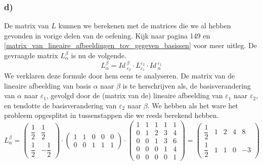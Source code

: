 \documentclass[lineaire_algebra_oplossingen.tex]{subfiles}
\begin{document}
\subsubsection*{d)}
De matrix van $L$ kunnen we berekenen met de matrices die we al hebben gevonden in vorige delen van de oefening. Kijk naar pagina 149 en \ref{matrix_van_lineaire_afbeeldingen_tov_gegeven_basissen} voor meer uitleg.
De gevraagde matrix $L_\alpha^\beta$ is nu de volgende.
\[
L_\alpha^\beta = \textit{Id}\,_{\varepsilon_2}^\beta\cdot L_{\varepsilon_1}^{\varepsilon_2}\cdot \textit{Id}\,_{\alpha}^{\varepsilon_1}
\]
We verklaren deze formule door hem eens te analyseren. De matrix van de lineaire afbeelding van basis $\alpha$ naar $\beta$ is te herschrijven als, de basisverandering van $\alpha$ naar $\varepsilon_1$, gevolgd door de (matrix van de) lineaire afbeelding van $\varepsilon_1$ naar $\varepsilon_2$, en tenslotte de basisverandering van $\varepsilon_2$ naar $\beta$. We hebben als het ware het probleem opgesplitst in tussenstappen die we reeds berekend hebben.
\[
L_\alpha^\beta = 
\begin{pmatrix}
\dfrac{1}{2} & \dfrac{1}{2}\\[8pt]
\dfrac{1}{2} & -\dfrac{1}{2}
\end{pmatrix}
\cdot
\begin{pmatrix}
1 & 1 & 0 & 0 & 0\\
0 & 0 & 1 & 1 & 1
\end{pmatrix}
\cdot
\begin{pmatrix}
1 & 1 & 1 & 1 & 1 \\ 
0 & 1 & 2 & 3 & 4 \\ 
0 & 0 & 1 & 3 & 6 \\ 
0 & 0 & 0 & 1 & 4 \\ 
0 & 0 & 0 & 0 & 1
\end{pmatrix}
=
\begin{pmatrix}
\dfrac{1}{2} & 1 & 2 & 4 &  8 \\[8pt]
\dfrac{1}{2} & 1 & 1 & 0 & -3
\end{pmatrix}
\]
\end{document}
